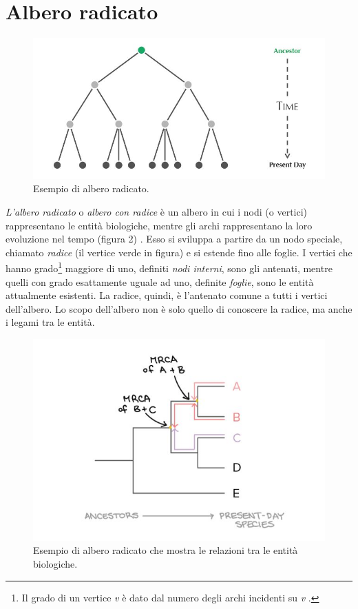 \section{Albero radicato}
\begin{figure}[ht]
\begin{center}
\includegraphics[scale=0.7]{rooted_tree.jpg}
\end{center}
\caption{Esempio di albero radicato.}
\label{Img:RootedTree}
\end{figure}
\textit{L'albero radicato} o \textit{albero con radice} è un albero in cui i nodi (o vertici) rappresentano le entità biologiche, mentre gli archi rappresentano la loro evoluzione nel tempo (figura 2) \cite{bioinfalganactivelearningapproachparttwo}. Esso si sviluppa a partire da un nodo speciale, chiamato \textit{radice} (il vertice verde in figura) e si estende fino alle foglie. I vertici che hanno grado\footnote{Il grado di un vertice \textit{v} è dato dal numero degli archi incidenti su \textit{v} \cite{algoritmiEStruttureDati2}.} maggiore di uno, definiti \textit{nodi interni}, sono gli antenati, mentre quelli con grado esattamente uguale ad uno, definite \textit{foglie}, sono le entità attualmente esistenti. La radice, quindi, è l'antenato comune a tutti i vertici dell'albero.
\newline
Lo scopo dell'albero non è solo quello di conoscere la radice, ma anche i legami tra le entità.
\newline
\begin{figure}[h!]
	\includegraphics[width=\linewidth]{rooted_tree_2.jpg}
 	\caption{Esempio di albero radicato che mostra le relazioni tra le entità biologiche.}
  	\label{fig:RootedTree}
\end{figure}
